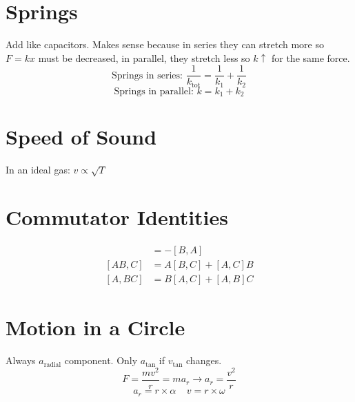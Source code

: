 \documentclass[10pt,letter]{article}
\begin{document}
\section{Springs} %
\label{sec:springs}
Add like capacitors. Makes sense because in series they can stretch more so $F=kx$ must be decreased, in parallel, they stretch less so $k \uparrow$ for the same force.\\
\begin{equation}
    \textrm{Springs in series: } \frac{1}{k_{\textrm{tot}}} = \frac{1}{k_1} + \frac{1}{k_2}
\end{equation}
\begin{equation}
    \textrm{Springs in parallel: } k = k_1 + k_2
\end{equation}

\section{Speed of Sound} %
\label{sec:speed_of_sound}
In an ideal gas: $v \propto \sqrt{T}$

\section{Commutator Identities} %
\label{sec:commutator_identities}
\begin{align}
[A,B]&=-[B,A]\\
[AB,C] &= A[B,C] + [A,C]B\\
[A,BC] &= B[A,C] + [A,B]C
\end{align}

\section{Motion in a Circle} %
\label{sec:motion_in_a_circle}
Always $a_{\textrm{radial}}$ component. Only $a_{\textrm{tan}}$ if $v_{\textrm{tan}}$ changes.
\begin{equation}
    F = \frac{mv^2}{r} = ma_r \rightarrow a_r = \frac{v^2}{r}
\end{equation}
\begin{equation}
    a_r = r \times \alpha~~~~~ v = r \times \omega
\end{equation}
\end{document}
